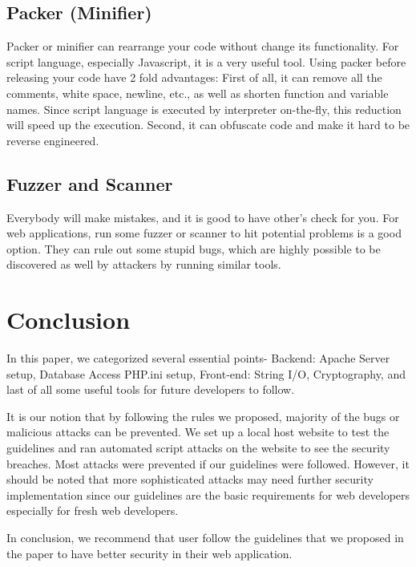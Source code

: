 \documentclass[conference]{IEEEtran}
\begin{document}
\subsection{Packer (Minifier)}
Packer or minifier can rearrange your code without change its
functionality.
For script language, especially Javascript, it is a very useful tool.
Using packer before releasing your code have 2 fold advantages:
First of all, it can remove all the comments, white space, newline, etc.,
as well as
shorten function and
variable names.
Since script language is executed by interpreter on-the-fly, this reduction
will speed up the execution.
Second, it can obfuscate code and make it hard to be reverse engineered.


\subsection{Fuzzer and Scanner}
Everybody will make mistakes, and it is good to have other's check for you.
For web applications, run some fuzzer or scanner to hit potential problems
is a good option.
They can rule out some stupid bugs, which are highly possible
to be discovered as well by attackers by running similar tools.

\section{Conclusion}
In this paper, we categorized several essential points- Backend: Apache Server setup, Database Access PHP.ini setup, Front-end: String I/O, Cryptography, and last of all some useful tools
for future developers to follow. 

It is our notion that by following the rules we proposed, majority of the bugs or malicious attacks can be
prevented. We set up a local host website to test the guidelines and ran automated script attacks on the website to see the security breaches. Most attacks were prevented
if our guidelines were followed. However, it should be noted that more sophisticated attacks may need further security implementation since our guidelines are the basic requirements
for web developers especially for fresh web developers.

In conclusion, we recommend that user follow the guidelines that we proposed in the paper to have better security in their web application.



\end{document}
